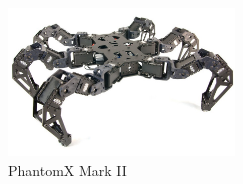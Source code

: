 \newpage

\begin{figure}[h]
  \begin{center}
    \includegraphics[width=60mm, clip]{figure/chapter2/phantomx_mk2.jpg}
    \caption{PhantomX Mark I\hspace{-1.2pt}I}
    \label{fig:phantomx_mk2} %
  \end{center}
\end{figure}

